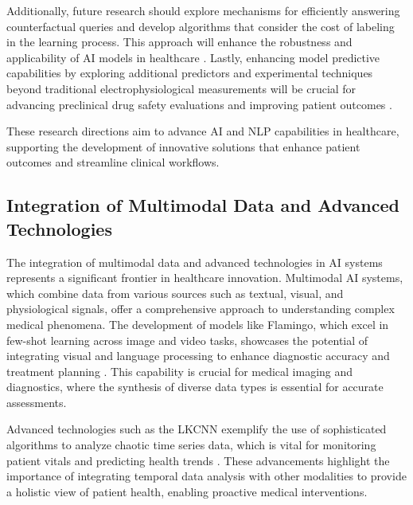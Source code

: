 Additionally, future research should explore mechanisms for efficiently answering counterfactual queries and develop algorithms that consider the cost of labeling in the learning process. This approach will enhance the robustness and applicability of AI models in healthcare \cite{sen2018supervisingfeatureinfluence}. Lastly, enhancing model predictive capabilities by exploring additional predictors and experimental techniques beyond traditional electrophysiological measurements will be crucial for advancing preclinical drug safety evaluations and improving patient outcomes \cite{xi2022statisticallearningpreclinicaldrug}.



These research directions aim to advance AI and NLP capabilities in healthcare, supporting the development of innovative solutions that enhance patient outcomes and streamline clinical workflows.



\subsection{Integration of Multimodal Data and Advanced Technologies} \label{subsec:Integration of Multimodal Data and Advanced Technologies}



The integration of multimodal data and advanced technologies in AI systems represents a significant frontier in healthcare innovation. Multimodal AI systems, which combine data from various sources such as textual, visual, and physiological signals, offer a comprehensive approach to understanding complex medical phenomena. The development of models like Flamingo, which excel in few-shot learning across image and video tasks, showcases the potential of integrating visual and language processing to enhance diagnostic accuracy and treatment planning \cite{alayrac2022flamingo}. This capability is crucial for medical imaging and diagnostics, where the synthesis of diverse data types is essential for accurate assessments.



Advanced technologies such as the LKCNN exemplify the use of sophisticated algorithms to analyze chaotic time series data, which is vital for monitoring patient vitals and predicting health trends \cite{boull2019classificationchaotictimeseries}. These advancements highlight the importance of integrating temporal data analysis with other modalities to provide a holistic view of patient health, enabling proactive medical interventions.



